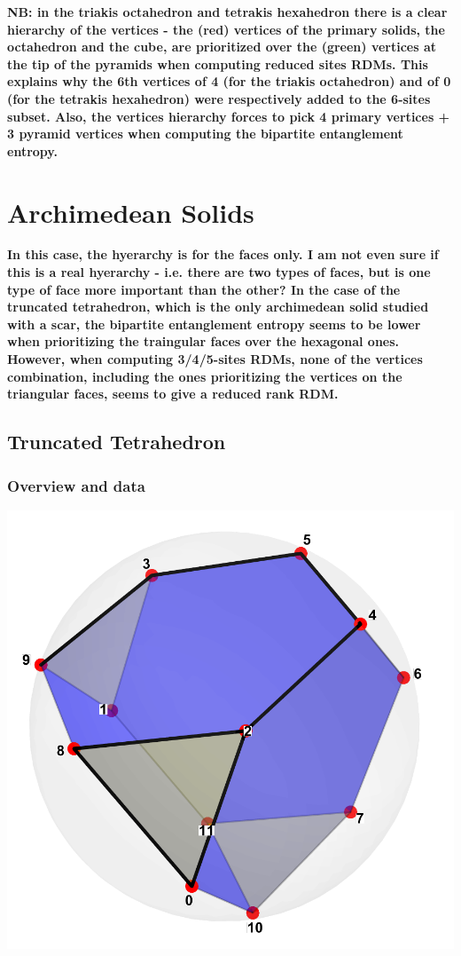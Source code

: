 \documentclass[11pt,a4paper]{article}
\begin{document}

\noindent\textbf{NB: in the triakis octahedron and tetrakis hexahedron there is a clear hierarchy of the vertices - the (red) vertices of the primary solids, the octahedron and the cube, are prioritized over the (green) vertices at the tip of the pyramids when computing reduced sites RDMs. This explains why the 6th vertices of 4 (for the triakis octahedron) and of 0 (for the tetrakis hexahedron) were respectively added to the 6-sites subset. Also, the vertices hierarchy forces to pick 4 primary vertices + 3 pyramid vertices when computing the bipartite entanglement entropy.}

\section*{Archimedean Solids}

\noindent\textbf{In this case, the hyerarchy is for the faces only. I am not even sure if this is a real hyerarchy - i.e. there are two types of faces, but is one type of face more important than the other? In the case of the truncated tetrahedron, which is the only archimedean solid studied with a scar, the bipartite entanglement entropy seems to be lower when prioritizing the traingular faces over the hexagonal ones. However, when computing 3/4/5-sites RDMs, none of the vertices combination, including the ones prioritizing the vertices on the triangular faces, seems to give a reduced rank RDM.}


\subsection*{Truncated Tetrahedron}

\subsubsection*{Overview and data}
\begin{center}
  \includegraphics[width=.6\linewidth]{truncatedtetrahedron}
\end{center}
\end{document}
